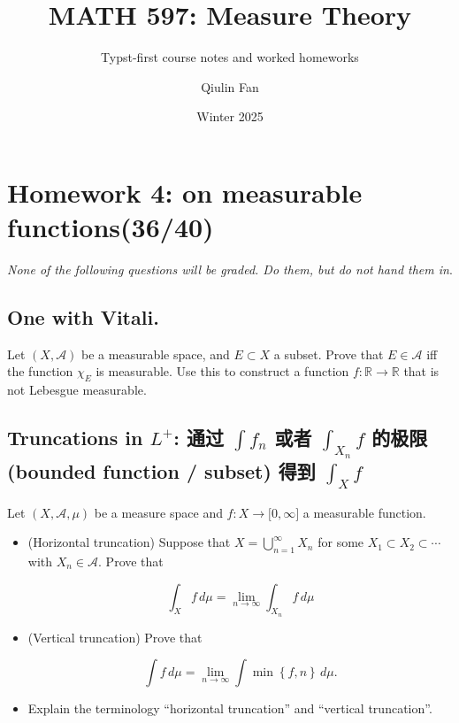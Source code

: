 \documentclass{qlnotes-export}
\title{MATH 597: Measure Theory}
\subtitle{Typst-first course notes and worked homeworks}
\author{Qiulin Fan}
\date{Winter 2025}
\begin{document}
\mainmatter
\chapter{Homework 4: on measurable functions(36/40)}\label{homework-4-on-measurable-functions3640}

\emph{None of the following questions will be graded. Do them, but do not hand them in}.

\section{One with Vitali.}

Let \((X,\mathcal{A})\) be a measurable space, and \(E \subset X\) a subset. Prove that \(E \in \mathcal{A}\) iff the function \(\chi_{E}\) is measurable. Use this to construct a function \(f:{\mathbb{R}}\rightarrow{\mathbb{R}}\) that is not Lebesgue measurable.

\section{\texorpdfstring{Truncations in \(L^{+}\): 通过 \(\int f_{n}\) 或者 \(\int_{X_{n}}f\) 的极限 (bounded function / subset) 得到 \(\int_{X}f\)}{Truncations in L\^{}\{+\}: 通过 \textbackslash int f\_\{n\} 或者 \textbackslash int\_\{X\_\{n\}\}f 的极限 (bounded function / subset) 得到 \textbackslash int\_\{X\}f}}\label{truncations-in-l-ux901aux8fc7-int-f_n-ux6216ux8005-int_x_n-f-ux7684ux6781ux9650-bounded-function-subset-ux5f97ux5230-int_x-f}

Let \((X,\mathcal{A},\mu)\) be a measure space and \(f:X\rightarrow\lbrack 0,\infty\rbrack\) a measurable function.

\begin{itemize}
\item
  (Horizontal truncation) Suppose that \(X = \bigcup_{n = 1}^{\infty}X_{n}\) for some \(X_{1} \subset X_{2} \subset \cdots\) with \(X_{n} \in \mathcal{A}\). Prove that

  \[\int_{X}f\, d\mu = \lim\limits_{n\rightarrow\infty}\int_{X_{n}}f\, d\mu\]
\item
  (Vertical truncation) Prove that

  \[\int f\, d\mu = \lim\limits_{n\rightarrow\infty}\int\min\left\{ {f,n} \right\}\, d\mu.\]
\item
  Explain the terminology ``horizontal truncation'' and ``vertical truncation''.
\end{itemize}
\end{document}
